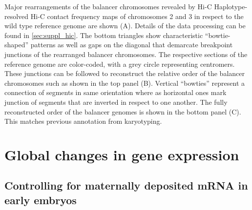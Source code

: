     {Major rearrangements of the balancer chromosomes revealed by Hi-C}{
    Haplotype-resolved Hi-C contact frequency maps of chromosomes 2 and 3 in
    respect to the wild type reference genome are shown (A). Details of the data
    processing can be found in \cref{sec:suppl_hic}. The bottom triangles show
    characteristic ``bowtie-shaped'' patterns as well as gaps on the diagonal
    that demarcate breakpoint junctions of the rearranged balancer chromosomes.
    The respective sections of the reference genome are color-coded, with a grey
    circle representing centromers.
    These junctions can be followed to reconstruct the relative order of the
    balancer chromosomes such as shown in the top panel (B). Vertical ``bowties''
    represent a connection of segments in same orientation where as horizontal
    ones mark junction of segments that are inverted in respect to one another.
    The fully reconstructed order of the balancer genomes is shown in the bottom
    panel (C). This matches previous annotation from
    karyotyping.}






\section{Global changes in gene expression}
\label{sec:balancer_ase}


\subsection{Controlling for maternally deposited mRNA in early embryos}
\label{sec:balancer_maternal_rna}

